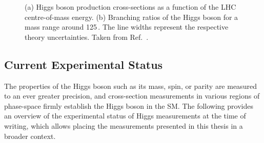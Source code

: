 \captionsetup[subfloat]{captionskip=5pt} %




\captionsetup[subfloat]{captionskip=5pt} %
\begin{figure}
  \begin{center}
  \end{center}
  \caption[(a) Higgs boson production cross-sections as a function of the LHC centre-of-mass energy. (b) Branching ratios of the Higgs boson for a mass range around 125\,\GeV.]{(a) Higgs boson production cross-sections as a function of the LHC centre-of-mass energy. (b) Branching ratios of the Higgs boson for a mass range around 125\,\GeV. The line widths represent the respective theory uncertainties. Taken from Ref.~\cite{YR4}.}
\end{figure}





\subsection{Current Experimental Status}


The properties of the Higgs boson such as its mass, spin, or parity are measured to an ever greater precision, and cross-section measurements in various regions of phase-space firmly establish the Higgs boson in the SM. 
The following provides an overview of the experimental status of Higgs measurements at the time of writing, which allows placing the measurements presented in this thesis in a broader context. 

